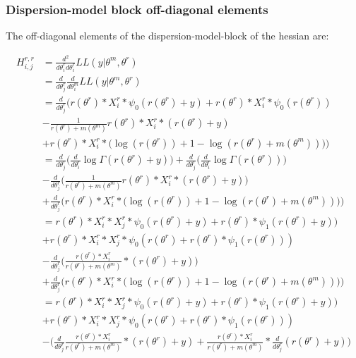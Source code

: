 \documentclass[bibliography=totoc,10pt]{scrartcl}
\begin{document}
\subsubsection{Dispersion-model block off-diagonal elements}
The off-diagonal elements of the dispersion-model-block of the hessian are:

\begin{equation}
\begin{split}
H^{r,r}_{i,j} &= \frac{d^2}{d \theta^r_i d \theta^r_i} LL(y|\theta^m, \theta^r) \\
&= \frac{d}{d \theta^r_j} \frac{d}{d \theta^m_i} LL(y|\theta^m, \theta^r) \\
&= \frac{d}{d \theta^r_j} \bigg(   r(\theta^r) * X^r_{i} * \psi_0(r(\theta^r)+y)+ r(\theta^r) * X^r_{i} * \psi_0(r(\theta^r)) \\
&- \frac{1}{r(\theta^r)+m(\theta^m)} r(\theta^r) * X^r_{i}  *(r(\theta^r) + y) \\
&+ r(\theta^r) * X^r_{i}  * \bigg( \log(r(\theta^r)) + 1 - \log(r(\theta^r)+m(\theta^m)) \bigg)  \bigg) \\
&= \frac{d}{d \theta^r_j} \bigg(  \frac{d}{d \theta^r_i} \log \Gamma(r(\theta^r)+y) \bigg) + \frac{d}{d \theta^r_j} \bigg( \frac{d}{d \theta^r_i} \log \Gamma(r(\theta^r)) \bigg) \\
&- \frac{d}{d \theta^r_j} \bigg(  \frac{1}{r(\theta^r)+m(\theta^m)} r(\theta^r) * X^r_{i}  *(r(\theta^r) + y) \bigg) \\
&+ \frac{d}{d \theta^r_j} \bigg( r(\theta^r) * X^r_{i}  * \bigg( \log(r(\theta^r)) + 1 - \log(r(\theta^r)+m(\theta^m)) \bigg)  \bigg) \\
&= r(\theta^r) * X^r_{i} * X^r_{j} * \psi_0(r(\theta^r)+y) +  r(\theta^r) *  \psi_1(r(\theta^r)+y) ) \\
&+ r(\theta^r) * X^r_{i} * X^r_{j} * \psi_0(r(\theta^r) +  r(\theta^r) *  \psi_1(r(\theta^r)) ) \\
&- \frac{d}{d \theta^r_j} \bigg(  \frac{r(\theta^r) * X^r_{i} }{r(\theta^r)+m(\theta^m)} *(r(\theta^r) + y) \bigg) \\
&+ \frac{d}{d \theta^r_j} \bigg( r(\theta^r) * X^r_{i}  * \bigg( \log(r(\theta^r)) + 1 - \log(r(\theta^r)+m(\theta^m)) \bigg)  \bigg) \\
&= r(\theta^r) * X^r_{i} * X^r_{j} * \psi_0(r(\theta^r)+y) +  r(\theta^r) *  \psi_1(r(\theta^r)+y) ) \\
&+ r(\theta^r) * X^r_{i} * X^r_{j} * \psi_0(r(\theta^r) +  r(\theta^r) *  \psi_1(r(\theta^r)) ) \\
&- \bigg(  \frac{d}{d \theta^r_j} \frac{r(\theta^r) * X^r_{i} }{r(\theta^r)+m(\theta^m)} *(r(\theta^r) + y) + \frac{r(\theta^r) * X^r_{i} }{r(\theta^r)+m(\theta^m)} *\frac{d}{d \theta^r_j}  (r(\theta^r) + y) \bigg) \\

\end{split}
\end{equation}
\end{document}
